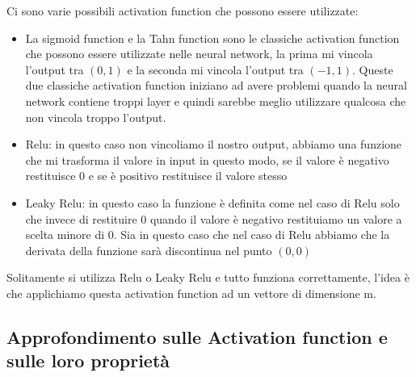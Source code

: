 \documentclass[14pt]{extreport}
\begin{document}
Ci sono varie possibili activation function che possono essere utilizzate:
\begin{itemize}
	\item La sigmoid function e la Tahn function sono le classiche activation function che possono essere utilizzate nelle neural network, la prima mi
	      vincola l'output tra $(0,1)$ e la seconda mi vincola l'output tra $(-1,1)$. Queste due classiche activation function iniziano ad avere
	      problemi quando la neural network contiene troppi layer e quindi sarebbe meglio utilizzare qualcosa che non vincola troppo l'output.
	\item Relu: in questo caso non vincoliamo il nostro output, abbiamo una funzione che mi trasforma il valore in input in questo modo, se il valore
	      è negativo restituisce 0 e se è positivo restituisce il valore stesso
	\item Leaky Relu: in questo caso la funzione è definita come nel caso di Relu solo che invece di restituire 0 quando il valore è negativo
	      restituiamo un valore a scelta minore di 0. Sia in questo caso che nel caso di Relu abbiamo che la derivata della funzione sarà discontinua
	      nel punto $(0,0)$
\end{itemize}

Solitamente si utilizza Relu o Leaky Relu e tutto funziona correttamente, l'idea è che applichiamo questa activation function ad un vettore di
dimensione m.

\subsection{Approfondimento sulle Activation function e sulle loro proprietà}
\end{document}
